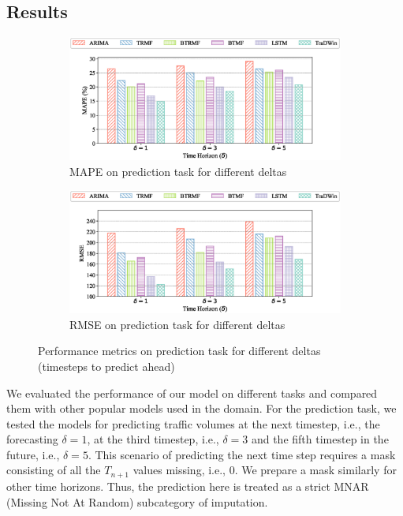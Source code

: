 \subsection{Results}

\begin{figure}[]
  \centering
  \begin{subfigure}[b]{0.9\textwidth}
      \centering
      \includegraphics[width=\textwidth]{mape_pred.eps}
      \caption{MAPE on prediction task for different deltas}
      \label{fig:mape_pred}
  \end{subfigure}
  
  \begin{subfigure}[b]{0.9\textwidth}
      \centering
      \includegraphics[width=\textwidth]{rmse_pred.eps}
      \caption{RMSE on prediction task for different deltas}
      \label{fig:rmse_pred}
  \end{subfigure}
  
  \caption{Performance metrics on prediction task for different deltas (timesteps to predict ahead)}
  \label{fig:pred_metrics}
\end{figure}

We evaluated the performance of our model on different tasks and compared them with other popular models used in the domain. For the prediction task, we tested the models for predicting traffic volumes at the next timestep, i.e., the forecasting $\delta = 1$, at the third timestep, i.e., $\delta = 3$ and the fifth timestep in the future, i.e., $\delta = 5$. This scenario of predicting the next time step requires a mask consisting of all the $T_{n+1}$ values missing, i.e., 0. We prepare a mask similarly for other time horizons. Thus, the prediction here is treated as a strict MNAR (Missing Not At Random) subcategory of imputation.

